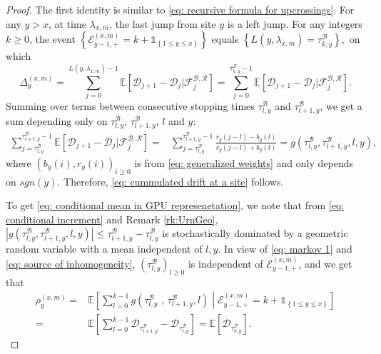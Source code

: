 \documentclass[EJP]{ejpecp} %
\newcommand{\abs}[1]{\left\vert #1 \right\vert}
\begin{document}
\begin{proof} 
	The first identity is similar to \eqref{eq: recursive formula for upcrossings}.
	For any $y>x $, at time $\lambda_{x,m}$, the last jump from site $y$ is a left jump. For any integers $k\geq 0$, the event 
	$\left\{ \mathcal{E}^{(x,m)}_{y-1,+} =k +  \mathbb{1}_{\left\{1\leq y\leq x\right\}}\right\}$ equals $\left\{  L(y,\lambda_{x,m}) = \tau_{k,y}^{\mathscr{B}} \right\}, $ on which
	\[
	\Delta_{y}^{(x,m)} =\sum_{j=0}^{ L(y,\lambda_{x,m})-1} \mathbb{E}\left[ \mathscr{D}_{j+1} -\mathscr{D}_{j}  \vert \mathcal{F}^{\mathscr{B},\mathscr{R}}_{j} \right] = \sum_{j=0}^{\tau^\mathscr{B}_{k,y}-1} \mathbb{E}\left[ \mathscr{D}_{j+1} -\mathscr{D}_{j}  \vert \mathcal{F}^{\mathscr{B},\mathscr{R}}_{j} \right].  
	\] 
	Summing over terms between consecutive stopping times $\tau^{{\mathscr{B}}}_{l,y} $ and $\tau^{\mathscr{B}}_{l+1,y} $,  we get a sum depending only on $\tau^{\mathscr{B}}_{l,y} $, $\tau^{\mathscr{B}}_{l+1,y} $, $l$ and $y$:
	\begin{align} \label{eq: conditional increment}
		\sum_{j=\tau^{\mathscr{B}}_{l,y}}^{\tau^{\mathscr{B}}_{l+1,y}-1} \mathbb{E}\left[ \mathscr{D}_{j+1} - \mathscr{D}_{j}  \vert \mathcal{F}^{\mathscr{B},\mathscr{R}}_{j} \right] =&
		\sum_{j=\tau^{\mathscr{B}}_{l,y}}^{\tau^{\mathscr{B}}_{l+1,y}-1} \frac{ r_y( j-l) - b_y(l)  }{ r_y( j-l) + b_y(l)  } 
		=  g\left(\tau^{\mathscr{B}}_{l,y},\tau^{\mathscr{B}}_{l+1,y},l,y\right),
	\end{align}   
	where $(b_y(i),r_y(i))_{i\geq 0}$ is from \eqref{eq: generalized weights} and only depends on $sgn(y)$. Therefore, \eqref{eq: cummulated drift at a site} follows.
	
	To get \eqref{eq: conditional mean in GPU represenetation}, we note that from \eqref{eq: conditional increment} and Remark \ref{rk:UrnGeo}, $\abs{  g\left(\tau^{\mathscr{B}}_{l,y},\tau^{\mathscr{B}}_{l+1,y},l,y\right)} \leq  \tau^{\mathscr{B}}_{l+1,y}-\tau^{\mathscr{B}}_{l,y}$ is stochastically dominated by a geometric random variable with a mean independent of $l, y$. In view of \eqref{eq: markov 1} and \eqref{eq: source of inhomogeneity}, $\left(\tau^{\mathscr{B}}_{l,y}\right)_{l \geq 0} $ is independent of $ \mathcal{E}^{(x,m)}_{y-1,+}$, and we get that 
	\begin{align*} 
		\rho_{y}^{(x,m)} 
		=& \mathbb{E}\left[ \sum_{l=0 }^{ k -1  }  g\left(\tau^{\mathscr{B}}_{l,y}\,\,,\,\tau^{\mathscr{B}}_{l+1,y} , l \right) \middle| \mathcal{E}^{(x,m)}_{y-1,+} = k + \mathbb{1}_{\left\{1\leq y\leq x\right\}} \right]	
		\\
		=&
		 \mathbb{E}\left[ \sum_{l=0}^{k-1}  \mathscr{D}_{\tau^{\mathscr{B}}_{l+1,y}} -\mathscr{D}_{\tau^{\mathscr{B}}_{l,y}} \right]  
		= \mathbb{E}\left[  \mathscr{D}_{\tau^{\mathscr{B}}_{k,y}} \right]
		.
	\end{align*}
\end{proof}
\end{document}
